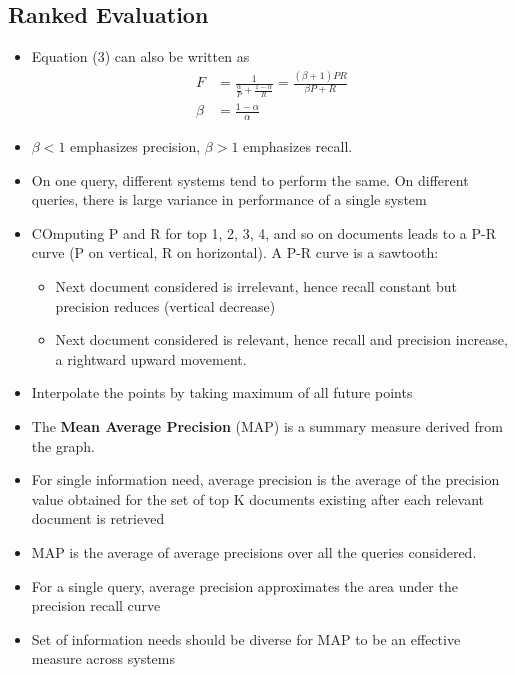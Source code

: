 \documentclass{article}
\begin{document}
\subsection{Ranked Evaluation}
\begin{itemize}
    \item Equation (3) can also be written as
    \begin{align}
        F &= \frac{1}{\frac{\alpha}{P} + \frac{1-\alpha}{R}} = \frac{(\beta+1)PR}{\beta P + R} \\
        \beta &= \frac{1-\alpha}{\alpha}
    \end{align}
    
    \item $\beta < 1$ emphasizes precision, $\beta > 1$ emphasizes recall.
    
    \item On one query, different systems tend to perform the same. On different queries, there is large variance in performance of a single system 
    
    \item COmputing P and R for top 1, 2, 3, 4, and so on documents leads to a P-R curve (P on vertical, R on horizontal). A P-R curve is a sawtooth:
    \begin{itemize}
        \item Next document considered is irrelevant, hence recall constant but precision reduces (vertical decrease)
        
        \item Next document considered is relevant, hence recall and precision increase, a rightward upward movement. 
    \end{itemize}
    
    \item Interpolate the points by taking maximum of all future points
    
    \item The \textbf{Mean Average Precision} (MAP) is a summary measure derived from the graph. 
    
    \item For single information need, average precision is the average of the precision value obtained for the set of top K documents existing after each relevant document is retrieved
    
    \item MAP is the average of average precisions over all the queries considered. 
    
    \item For a single query, average precision approximates the area under the precision recall curve
    
    \item Set of information needs should be diverse for MAP to be an effective measure across systems
\end{itemize}
\end{document}
